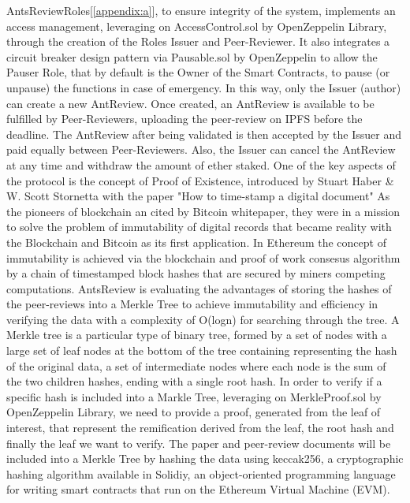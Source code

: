 \documentclass[runningheads]{llncs}
\begin{document}
AntsReviewRoles[\ref{appendix:a}], to ensure integrity of the system, implements an access management, leveraging on AccessControl.sol by OpenZeppelin Library, through the creation of the Roles Issuer and Peer-Reviewer.
\newline It also integrates a circuit breaker design pattern via Pausable.sol by OpenZeppelin to allow the Pauser Role, that by default is the Owner of the Smart Contracts, to pause (or unpause) the functions in case of emergency.
\newline In this way, only the Issuer (author) can create a new AntReview.
\newline Once created, an AntReview is available to be fulfilled by Peer-Reviewers, uploading the peer-review on IPFS before the deadline.
\newline The AntReview after being validated is then accepted by the Issuer and paid equally between Peer-Reviewers.
\newline Also, the Issuer can cancel the AntReview at any time and withdraw the amount of ether staked.
\newline One of the key aspects of the protocol is the concept of Proof of Existence, introduced by Stuart Haber \& W. Scott Stornetta with the paper "How to time-stamp a digital document" 
\newline As the pioneers of blockchain an cited by Bitcoin whitepaper, they were in a mission to solve the problem of immutability of digital records that became reality with the Blockchain and Bitcoin as its first application.
\newline In Ethereum the concept of immutability is achieved via the blockchain and proof of work consesus algorithm by a chain of timestamped block hashes that are secured by miners competing computations.
\newline AntsReview is evaluating the advantages of storing the hashes of the peer-reviews into a Merkle Tree to achieve immutability and efficiency in verifying the data with a complexity of O(logn) for searching through the tree.
\newline A Merkle tree is a particular type of binary tree, formed by a set of nodes with a large set of leaf nodes at the bottom of the tree containing representing the hash of the original data, a set of intermediate nodes where each node is the sum of the two children hashes, ending with a single root hash.
\newline In order to verify if a specific hash is included into a Markle Tree, leveraging on MerkleProof.sol by OpenZeppelin Library, we need to provide a proof, generated from the leaf of interest, that represent the remification derived from the leaf, the root hash and finally the leaf we want to verify.
\newline The paper and peer-review documents will be included into a Merkle Tree by hashing the data using keccak256, a cryptographic hashing algorithm available in Solidiy, an object-oriented programming language for writing smart contracts that run on the Ethereum Virtual Machine (EVM).
\end{document}
